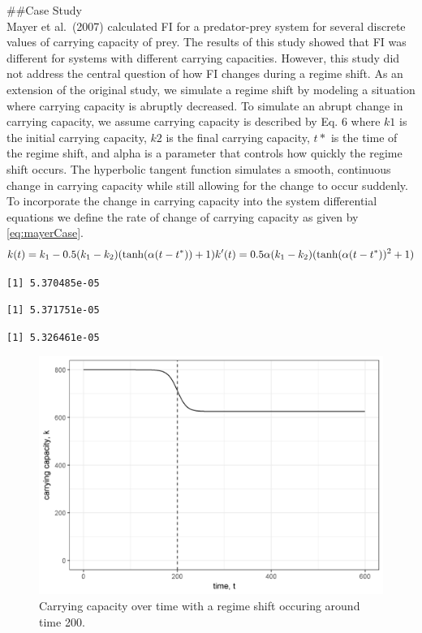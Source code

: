 \documentclass[12pt,twoside]{reedthesis}
\begin{document}
\#\#Case Study\\
Mayer et al.~(2007) calculated FI for a predator-prey system for several discrete values of carrying capacity of prey. The results of this study showed that FI was different for systems with different carrying capacities. However, this study did not address the central question of how FI changes during a regime shift. As an extension of the original study, we simulate a regime shift by modeling a situation where carrying capacity is abruptly decreased. To simulate an abrupt change in carrying capacity, we assume carrying capacity is described by Eq. 6 where \(k1\) is the initial carrying capacity, \(k2\) is the final carrying capacity, \(t*\) is the time of the regime shift, and alpha is a parameter that controls how quickly the regime shift occurs. The hyperbolic tangent function simulates a smooth, continuous change in carrying capacity while still allowing for the change to occur suddenly. To incorporate the change in carrying capacity into the system differential equations we define the rate of change of carrying capacity as given by \eqref{eq:mayerCase}.\\
\begin{equation}  
  k(t) = k_1  - 0.5(k_1-k_2)(\tanh(\alpha (t-t^*))+1)     \\
  k'(t) = 0.5\alpha (k_1-k_2)(\tanh(\alpha(t-t^*))^2 +1)      \\ 
\label{eq:mayerCase}
\end{equation}
\begin{verbatim}
[1] 5.370485e-05
\end{verbatim}
\begin{verbatim}
[1] 5.371751e-05
\end{verbatim}
\begin{verbatim}
[1] 5.326461e-05
\end{verbatim}
\begin{figure}
\includegraphics[width=1\linewidth]{./chapterFiles/fiGuide/figures/kByTime} \caption{Carrying capacity over time with a regime shift occuring around time 200.}\label{fig:kByTime}
\end{figure}
\end{document}
